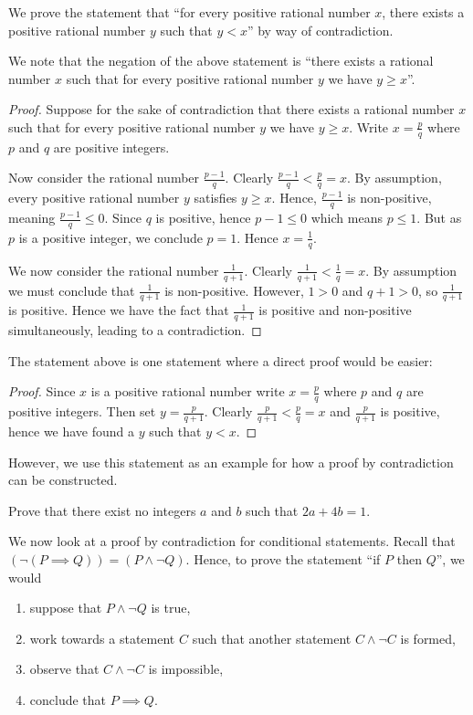 \begin{example}
    We prove the statement that ``for every positive rational number $x$, there exists a positive rational number $y$ such that $y < x$'' by way of contradiction.
    
    We note that the negation of the above statement is ``there exists a rational number $x$ such that for every positive rational number $y$ we have $y \geq x$''.
    \begin{proof}
        Suppose for the sake of contradiction that there exists a rational number $x$ such that for every positive rational number $y$ we have $y \geq x$. Write $x = \frac pq$ where $p$ and $q$ are positive integers.
        
        Now consider the rational number $\frac{p-1}{q}$. Clearly $\frac{p-1}{q} < \frac pq = x$. By assumption, every positive rational number $y$ satisfies $y \geq x$. Hence, $\frac{p-1}{q}$ is non-positive, meaning $\frac{p-1}{q} \leq 0$. Since $q$ is positive, hence $p - 1 \leq 0$ which means $p \leq 1$. But as $p$ is a positive integer, we conclude $p = 1$. Hence $x = \frac 1q$.
        
        We now consider the rational number $\frac{1}{q+1}$. Clearly $\frac{1}{q+1} < \frac{1}{q} = x$. By assumption we must conclude that $\frac{1}{q+1}$ is non-positive. However, $1 > 0$ and $q + 1 > 0$, so $\frac{1}{q+1}$ is positive. Hence we have the fact that $\frac{1}{q+1}$ is positive and non-positive simultaneously, leading to a contradiction.
    \end{proof}
\end{example}
\begin{remark}
    The statement above is one statement where a direct proof would be easier:
    \begin{proof}
        Since $x$ is a positive rational number write $x = \frac pq$ where $p$ and $q$ are positive integers. Then set $y = \frac{p}{q+1}$. Clearly $\frac{p}{q+1} < \frac{p}{q} = x$ and $\frac{p}{q+1}$ is positive, hence we have found a $y$ such that $y < x$.
    \end{proof}
    However, we use this statement as an example for how a proof by contradiction can be constructed.
\end{remark}

\begin{exercise}
    Prove that there exist no integers $a$ and $b$ such that $2a + 4b = 1$.
\end{exercise}

We now look at a proof by contradiction for conditional statements. Recall that $(\lnot(P \implies Q)) = (P \land \lnot Q)$. Hence, to prove the statement ``if $P$ then $Q$'', we would
\begin{enumerate}
    \item suppose that $P \land \lnot Q$ is true,
    \item work towards a statement $C$ such that another statement $C \land \lnot C$ is formed,
    \item observe that $C \land \lnot C$ is impossible,
    \item conclude that $P \implies Q$.
\end{enumerate}

